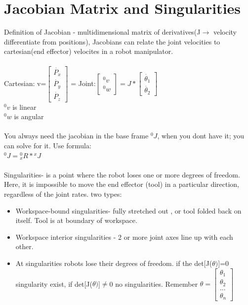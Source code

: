 \documentclass{article}
\begin{document}
\section{Jacobian Matrix and Singularities}
Definition of Jacobian - multidimensional matrix of derivatives(J$\rightarrow$ velocity differentiate from positions), Jacobians can relate the joint velocities to cartesian(end effector) velocites in a robot manipulator.  \\\\
Cartesian: v=$\begin{bmatrix}
   \dot{ P_x} \\
    \dot{P_y} \\
    \dot{P_z}
\end{bmatrix}$ = Joint:$\begin{bmatrix}
                          {}^0v\\
                          {}^0w
\end{bmatrix} = J * \begin{bmatrix}
\dot{\theta_1} \\
\dot{\theta_2}
\end{bmatrix}$\\
${}^0v$ is linear\\
${}^0w$ is angular\\\\
You always need the jacobian in the base frame ${}^0J$, when you dont have it; you can solve for it. Use formula:\\
${}^0J={}^0_xR * {}^xJ$\\\\
Singularities- is a point where the robot loses one or more degrees of freedom. Here, it is impossible to move the end effector (tool) in a particular direction, regardless of the joint rates. two types: \\
\begin{itemize}
    \item Workspace-bound singularities- fully stretched out , or tool folded back on itself. Tool is at boundary of workspace.
    \item Workspace interior singularities - 2 or more joint axes line up with each other.
    \item At singularities robots lose their degrees of freedom. if the det[J($\theta)$]=0 singularity exist, if det[J($\theta)$]$\neq$0 no singularities. Remember $\theta=\begin{bmatrix}
        \theta_1 \\
        \theta_2\\
        ...\\
        \theta_n
    \end{bmatrix}$
\end{itemize}
\end{document}
